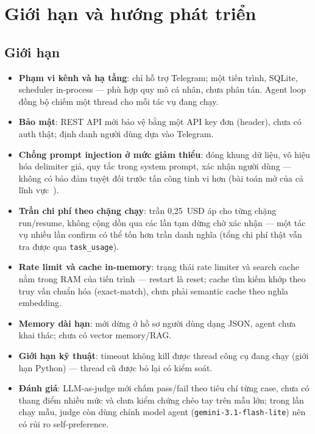 \section{Giới hạn và hướng phát triển}
\label{sec:gioi-han}

\subsection{Giới hạn}

\begin{itemize}
  \item \textbf{Phạm vi kênh và hạ tầng}: chỉ hỗ trợ Telegram; một tiến trình,
        SQLite, scheduler in-process --- phù hợp quy mô cá nhân, chưa phân tán.
        Agent loop đồng bộ chiếm một thread cho mỗi tác vụ đang chạy.
  \item \textbf{Bảo mật}: REST API mới bảo vệ bằng một API key đơn (header),
        chưa có auth thật; định danh người dùng dựa vào Telegram.
  \item \textbf{Chống prompt injection ở mức giảm thiểu}: đóng khung dữ liệu,
        vô hiệu hóa delimiter giả, quy tắc trong system prompt, xác nhận người
        dùng --- không có bảo đảm tuyệt đối trước tấn công tinh vi hơn (bài
        toán mở của cả lĩnh vực~\cite{greshake2023injection}).
  \item \textbf{Trần chi phí theo chặng chạy}: trần 0{,}25~USD áp cho từng
        chặng run/resume, không cộng dồn qua các lần tạm dừng chờ xác nhận ---
        một tác vụ nhiều lần confirm có thể tốn hơn trần danh nghĩa (tổng chi
        phí thật vẫn tra được qua \texttt{task\_usage}).
  \item \textbf{Rate limit và cache in-memory}: trạng thái rate limiter và
        search cache nằm trong RAM của tiến trình --- restart là reset; cache
        tìm kiếm khớp theo truy vấn chuẩn hóa (exact-match), chưa phải
        semantic cache theo nghĩa embedding.
  \item \textbf{Memory dài hạn}: mới dừng ở hồ sơ người dùng dạng JSON, agent
        chưa khai thác; chưa có vector memory/RAG.
  \item \textbf{Giới hạn kỹ thuật}: timeout không kill được thread công cụ
        đang chạy (giới hạn Python) --- thread cũ được bỏ lại có kiểm soát.
  \item \textbf{Đánh giá}: LLM-as-judge mới chấm pass/fail theo tiêu chí từng
        case, chưa có thang điểm nhiều mức và chưa kiểm chứng chéo tay trên
        mẫu lớn; trong lần chạy mẫu, judge còn dùng chính model agent
        (\texttt{gemini-3.1-flash-lite}) nên có rủi ro self-preference.

\end{itemize}
